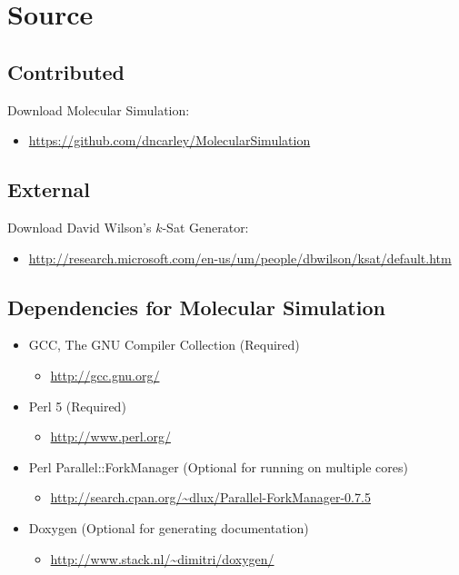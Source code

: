 
\chapter{Source}

\section{Contributed}

\noindent Download Molecular Simulation:

\begin{itemize}
	\item \url{https://github.com/dncarley/MolecularSimulation}
\end{itemize}

\section{External}

\noindent Download David Wilson's $k$-{\sc Sat} Generator:

\begin{itemize}
	\item \url{http://research.microsoft.com/en-us/um/people/dbwilson/ksat/default.htm}
\end{itemize}


\section{Dependencies for Molecular Simulation}

	\begin{itemize}
		\item GCC, The GNU Compiler Collection (Required)
			\begin{itemize}
				\item  \url{http://gcc.gnu.org/}
			\end{itemize}		
		\item Perl 5 (Required)
				\begin{itemize}
					\item \url{http://www.perl.org/}
				\end{itemize}
		\item Perl Parallel::ForkManager (Optional for running on multiple cores)
			\begin{itemize}
				\item \url{http://search.cpan.org/~dlux/Parallel-ForkManager-0.7.5}
			\end{itemize}				
		\item Doxygen (Optional for generating documentation)
			\begin{itemize}
				\item \url{http://www.stack.nl/~dimitri/doxygen/}
			\end{itemize}				
	\end{itemize}
